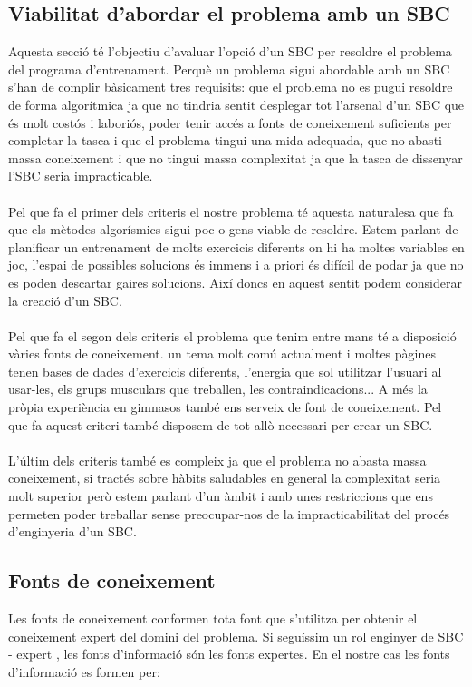 \subsection{Viabilitat d'abordar el problema amb un SBC}
Aquesta secció té l'objectiu d'avaluar l'opció d'un SBC per resoldre el problema del programa d'entrenament. 
Perquè un problema sigui abordable amb un SBC s'han de complir bàsicament tres requisits: que el problema no es pugui resoldre de forma algorítmica ja que no tindria sentit desplegar tot l'arsenal d'un SBC que és molt costós i laboriós, poder tenir accés a fonts de coneixement suficients per completar la tasca i que el problema tingui una mida adequada, que no abasti massa coneixement i que no tingui massa complexitat ja que la tasca de dissenyar l'SBC seria impracticable.
\\\\
Pel que fa el primer dels criteris el nostre problema té aquesta naturalesa que fa que els mètodes algorísmics sigui poc o gens viable de resoldre. Estem parlant de planificar un entrenament de molts exercicis diferents on hi ha moltes variables en joc, l'espai de possibles solucions és immens i a priori és difícil de podar ja que no es poden descartar gaires solucions.
Així doncs en aquest sentit podem considerar la creació d'un SBC.
\\\\
Pel que fa el segon dels criteris el problema que tenim entre mans té a disposició vàries fonts de coneixement. 
un tema molt comú actualment i moltes pàgines tenen bases de dades d'exercicis diferents, l'energia que sol utilitzar l'usuari al usar-les, els grups musculars que treballen, les contraindicacions... 
A més la pròpia experiència en gimnasos també ens serveix de font de coneixement. 
Pel que fa aquest criteri també disposem de tot allò necessari per crear un SBC.
\\\\
L'últim dels criteris també es compleix ja que el problema no abasta massa coneixement, si tractés sobre hàbits saludables en general la complexitat seria molt superior però estem parlant d'un àmbit i amb unes restriccions que ens permeten poder treballar sense preocupar-nos de la impracticabilitat del procés d'enginyeria d'un SBC.



\subsection{Fonts de coneixement}
Les fonts de coneixement conformen tota font que s'utilitza per obtenir el coneixement expert del domini del problema. Si seguíssim un rol enginyer de SBC - expert , les fonts d'informació són les fonts expertes. En el nostre cas les fonts d'informació es formen per:

